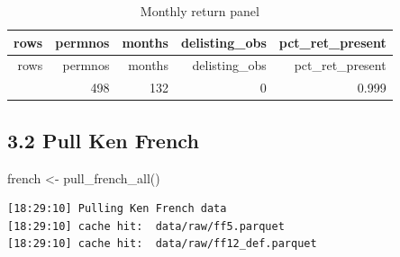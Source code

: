 \documentclass[
  letterpaper,
  DIV=11,
  numbers=noendperiod]{scrartcl}
\newenvironment{Shaded}{\begin{snugshade}}{\end{snugshade}}
\newcommand{\AttributeTok}[1]{\textcolor[rgb]{0.40,0.45,0.13}{#1}}
\newcommand{\DecValTok}[1]{\textcolor[rgb]{0.68,0.00,0.00}{#1}}
\newcommand{\FunctionTok}[1]{\textcolor[rgb]{0.28,0.35,0.67}{#1}}
\newcommand{\NormalTok}[1]{\textcolor[rgb]{0.00,0.23,0.31}{#1}}
\newcommand{\OtherTok}[1]{\textcolor[rgb]{0.00,0.23,0.31}{#1}}
\newcommand{\SpecialCharTok}[1]{\textcolor[rgb]{0.37,0.37,0.37}{#1}}
\newcommand{\StringTok}[1]{\textcolor[rgb]{0.13,0.47,0.30}{#1}}
\begin{document}
\begin{Shaded}
\end{Shaded}

\begin{longtable}[]{@{}rrrrr@{}}
\caption{Monthly return panel}\tabularnewline
\toprule\noalign{}
rows & permnos & months & delisting\_obs & pct\_ret\_present \\
\midrule\noalign{}
\endfirsthead
\toprule\noalign{}
rows & permnos & months & delisting\_obs & pct\_ret\_present \\
\midrule\noalign{}
\endhead
\bottomrule\noalign{}
\endlastfoot
62907 & 498 & 132 & 0 & 0.999 \\
\end{longtable}

\subsection{3.2 Pull Ken French}\label{pull-ken-french}

\begin{Shaded}
\begin{Highlighting}[]
\NormalTok{french }\OtherTok{\textless{}{-}} \FunctionTok{pull\_french\_all}\NormalTok{()}
\end{Highlighting}
\end{Shaded}

\begin{verbatim}
[18:29:10] Pulling Ken French data
[18:29:10] cache hit:  data/raw/ff5.parquet
[18:29:10] cache hit:  data/raw/ff12_def.parquet
\end{verbatim}

\begin{Shaded}
\end{Shaded}
\end{document}
